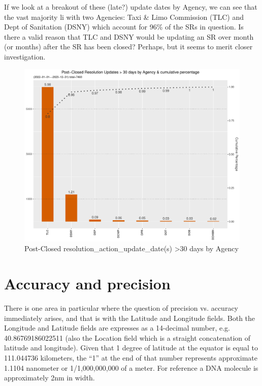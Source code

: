 \documentclass[12pt, titlepage]{article}
\begin{document}
{	If we look at a breakout of these (late?) update dates by Agency, 
	we can see that the vast majority li with two Agencies: Taxi \& Limo 
	Commission (TLC) and Dept of Sanitation (DSNY) which account 
	for 96\% of the SRs in question.  Is there a valid reason that TLC and 
	DSNY would be updating an SR over month (or months) after 
	the SR has been closed? Perhaps, but it seems to merit closer investigation. 

	\begin{figure}[tbp]
		\centering
		\includegraphics[width = \textwidth]{postClosedBarChart.pdf}
		\caption{Post-Closed resolution\_action\_update\_date(s) 
		\textgreater30 days by Agency}
		\label{fig:resolution-by-agency}
	\end{figure}		

\section{Accuracy and precision}\label{sec:precision}
There is one area in particular where the question of precision vs. 
accuracy immediately arises, and that is with the Latitude and Longitude 
fields. Both the Longitude and Latitude fields are expresses as a 14-decimal 
number, e.g. 40.86769186022511 (also the Location field which is a 
straight concatenation of latitude and longitude). Given that 1 
degree of latitude at the equator is equal to 111.044736 kilometers, 
the ``1'' at the end of that number represents approximate 1.1104 nanometer 
or 1/1,000,000,000 of a meter. For reference a DNA molecule is 
approximately 2nm in width. 

}
\end{document}
